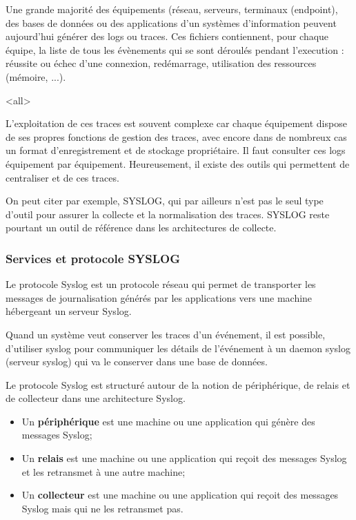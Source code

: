 
Une grande majorité des équipements (réseau, serveurs, terminaux (endpoint), des bases de données ou des applications d’un systèmes d'information peuvent aujourd’hui générer des logs ou traces.  Ces fichiers contiennent, pour chaque équipe, la liste de tous les évènements   qui se sont déroulés pendant l'execution : réussite ou échec d’une connexion, redémarrage, utilisation des ressources (mémoire, ...).


\mode<all>{}


L'exploitation de ces traces est souvent complexe car chaque équipement dispose de ses propres fonctions de gestion des traces, avec encore dans de nombreux cas un format  d'enregistrement et de stockage propriétaire. Il faut consulter ces logs équipement par équipement. Heureusement, il existe des outils qui permettent de centraliser et de  ces traces.

On peut citer par exemple, SYSLOG, qui par ailleurs n'est pas le seul type d'outil pour assurer la collecte et la normalisation des traces. SYSLOG reste pourtant un outil de référence dans les architectures de collecte.

\subsubsection{Services et protocole SYSLOG}

Le protocole Syslog est un protocole réseau qui permet de transporter les messages de journalisation générés par les applications vers une machine hébergeant un serveur Syslog. 

Quand un système veut conserver les traces d'un événement, il est possible, d'utiliser syslog pour communiquer les détails de l'événement à un daemon syslog (serveur syslog) qui va le conserver dans une base de données.

Le protocole Syslog est structuré autour de la notion de périphérique, de relais et de collecteur dans une architecture Syslog.

\begin{itemize}
  \item Un \textbf{périphérique} est une machine ou une application qui génère des messages Syslog;
  \item Un \textbf{relais} est une machine ou une application qui reçoit des messages Syslog et les retransmet à une autre machine;
  \item Un \textbf{collecteur} est une machine ou une application qui reçoit des messages Syslog mais qui ne les retransmet pas.
\end{itemize}

